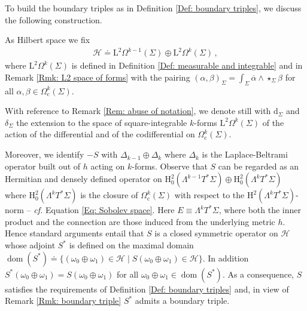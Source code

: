 To build the boundary triples as in Definition \ref{Def: boundary triples}, we discuss the following construction.


As Hilbert space we fix
	\begin{align*}
	\mathcal{H}\doteq\mathrm{L}^2\Omega^{k-1}(\Sigma)\oplus \mathrm{L}^2\Omega^k(\Sigma)\,,
	\end{align*}
	where $\mathrm{L}^2\Omega^k(\Sigma)$ is defined in Definition \ref{Def: measurable and integrable} and in Remark \ref{Rmk: L2 space of forms} with the pairing $(\alpha,\beta)_{\Sigma}=\int_\Sigma \overline{\alpha}\wedge \star_\Sigma\beta$ for all $\alpha,\beta\in\Omega^k_{\mathrm{c}}(\Sigma)$. 
	
	\begin{remark}
		With reference to Remark \ref{Rem: abuse of notation}, we denote still with $\mathrm{d}_\Sigma$ and $\delta_\Sigma$ the extension to the space of square-integrable $k$-forms $\mathrm{L}^2\Omega^k(\Sigma)$ of the action of the differential and of the codifferential on $\Omega^k_{\mathrm{c}}(\Sigma)$.
	\end{remark}
	



Moreover, we identify $-S$ with $\Delta_{k-1}\oplus\Delta_k$ where  $\Delta_k$ is the Laplace-Beltrami operator built out of $h$ acting on $k$-forms. Observe that $S$ can be regarded as an Hermitian and densely defined operator on $\mathrm{H}^2_0(\Lambda^{k-1}T^*\Sigma)\oplus \mathrm{H}^2_0(\Lambda^kT^*\Sigma)$ where $\mathrm{H}^2_0(\Lambda^kT^*\Sigma)$ is the closure of $\Omega^k_{\mathrm{c}}(\Sigma)$ with respect to the $\mathrm{H}^2(\Lambda^kT^*\Sigma)$-norm -- \textit{cf.} Equation \eqref{Eq: Sobolev space}. Here $E\equiv\Lambda^kT^*\Sigma$, where both the inner product and the connection are those induced from the underlying metric $h$.
Hence standard arguments entail that $S$ is a closed symmetric operator on $\mathcal{H}$ whose adjoint $S^*$ is defined on the maximal domain $\operatorname{dom}(S^*)\doteq\{(\omega_0\oplus\omega_1)\in\mathcal{H}\;|\;S(\omega_0\oplus\omega_1)\in\mathcal{H}\}$.
In addition $S^*(\omega_0\oplus\omega_1)=S(\omega_0\oplus\omega_1)$ for all $\omega_0\oplus\omega_1\in \operatorname{dom}(S^*)$.
As a consequence, $S$ satisfies the requirements of Definition \ref{Def: boundary triples} and, in view of Remark \ref{Rmk: boundary triple} $S^*$ admits a boundary triple.

